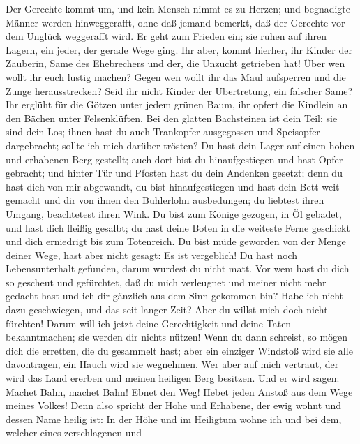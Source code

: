  Der Gerechte kommt um, und kein Mensch nimmt es zu
Herzen; und begnadigte Männer werden hinweggerafft, ohne daß jemand
bemerkt, daß der Gerechte vor dem Unglück weggerafft wird.
 Er geht zum Frieden ein; sie ruhen auf ihren Lagern, ein
jeder, der gerade Wege ging.  Ihr aber, kommt hierher, ihr
Kinder der Zauberin, Same des Ehebrechers und der, die Unzucht getrieben
hat!  Über wen wollt ihr euch lustig machen? Gegen wen
wollt ihr das Maul aufsperren und die Zunge herausstrecken? Seid ihr
nicht Kinder der Übertretung, ein falscher Same?  Ihr
erglüht für die Götzen unter jedem grünen Baum, ihr opfert die Kindlein
an den Bächen unter Felsenklüften.  Bei den glatten
Bachsteinen ist dein Teil; sie sind dein Los; ihnen hast du auch
Trankopfer ausgegossen und Speisopfer dargebracht; sollte ich mich
darüber trösten?  Du hast dein Lager auf einen hohen und
erhabenen Berg gestellt; auch dort bist du hinaufgestiegen und hast
Opfer gebracht;  und hinter Tür und Pfosten hast du dein
Andenken gesetzt; denn du hast dich von mir abgewandt, du bist
hinaufgestiegen und hast dein Bett weit gemacht und dir von ihnen den
Buhlerlohn ausbedungen; du liebtest ihren Umgang, beachtetest ihren
Wink.  Du bist zum Könige gezogen, in Öl gebadet, und hast
dich fleißig gesalbt; du hast deine Boten in die weiteste Ferne
geschickt und dich erniedrigt bis zum Totenreich.  Du
bist müde geworden von der Menge deiner Wege, hast aber nicht gesagt: Es
ist vergeblich! Du hast noch Lebensunterhalt gefunden, darum wurdest du
nicht matt.  Vor wem hast du dich so gescheut und
gefürchtet, daß du mich verleugnet und meiner nicht mehr gedacht hast
und ich dir gänzlich aus dem Sinn gekommen bin? Habe ich nicht dazu
geschwiegen, und das seit langer Zeit? Aber du willst mich doch nicht
fürchten!  Darum will ich jetzt deine Gerechtigkeit und
deine Taten bekanntmachen; sie werden dir nichts nützen! 
Wenn du dann schreist, so mögen dich die erretten, die du gesammelt
hast; aber ein einziger Windstoß wird sie alle davontragen, ein Hauch
wird sie wegnehmen. Wer aber auf mich vertraut, der wird das Land
ererben und meinen heiligen Berg besitzen.  Und er wird
sagen: Machet Bahn, machet Bahn! Ebnet den Weg! Hebet jeden Anstoß aus
dem Wege meines Volkes!  Denn also spricht der Hohe und
Erhabene, der ewig wohnt und dessen Name heilig ist: In der Höhe und im
Heiligtum wohne ich und bei dem, welcher eines zerschlagenen und
